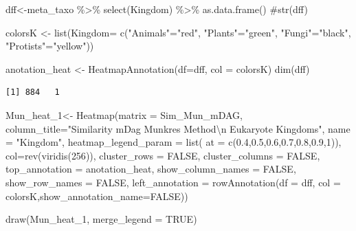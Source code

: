 \documentclass[
  letterpaper,
  DIV=11,
  numbers=noendperiod]{scrreprt}
\newenvironment{Shaded}{\begin{snugshade}}{\end{snugshade}}
\newcommand{\AttributeTok}[1]{\textcolor[rgb]{0.40,0.45,0.13}{#1}}
\newcommand{\CommentTok}[1]{\textcolor[rgb]{0.37,0.37,0.37}{#1}}
\newcommand{\ConstantTok}[1]{\textcolor[rgb]{0.56,0.35,0.01}{#1}}
\newcommand{\DecValTok}[1]{\textcolor[rgb]{0.68,0.00,0.00}{#1}}
\newcommand{\FloatTok}[1]{\textcolor[rgb]{0.68,0.00,0.00}{#1}}
\newcommand{\FunctionTok}[1]{\textcolor[rgb]{0.28,0.35,0.67}{#1}}
\newcommand{\NormalTok}[1]{\textcolor[rgb]{0.00,0.23,0.31}{#1}}
\newcommand{\OtherTok}[1]{\textcolor[rgb]{0.00,0.23,0.31}{#1}}
\newcommand{\SpecialCharTok}[1]{\textcolor[rgb]{0.37,0.37,0.37}{#1}}
\newcommand{\StringTok}[1]{\textcolor[rgb]{0.13,0.47,0.30}{#1}}
\begin{document}
\begin{Shaded}
\begin{Highlighting}[]
\NormalTok{dff}\OtherTok{\textless{}{-}}\NormalTok{meta\_taxo }\SpecialCharTok{\%\textgreater{}\%} \FunctionTok{select}\NormalTok{(Kingdom)  }\SpecialCharTok{\%\textgreater{}\%} \FunctionTok{as.data.frame}\NormalTok{()}
\CommentTok{\#str(dff)}

\NormalTok{colorsK }\OtherTok{\textless{}{-}} \FunctionTok{list}\NormalTok{(}\AttributeTok{Kingdom=} \FunctionTok{c}\NormalTok{(}\StringTok{"Animals"}\OtherTok{=}\StringTok{"red"}\NormalTok{,}
                           \StringTok{"Plants"}\OtherTok{=}\StringTok{"green"}\NormalTok{,}
                           \StringTok{"Fungi"}\OtherTok{=}\StringTok{"black"}\NormalTok{,}
                           \StringTok{"Protists"}\OtherTok{=}\StringTok{"yellow"}\NormalTok{))}

\NormalTok{anotation\_heat }\OtherTok{\textless{}{-}} \FunctionTok{HeatmapAnnotation}\NormalTok{(}\AttributeTok{df=}\NormalTok{dff, }\AttributeTok{col =}\NormalTok{ colorsK)}
\FunctionTok{dim}\NormalTok{(dff)}
\end{Highlighting}
\end{Shaded}

\begin{verbatim}
[1] 884   1
\end{verbatim}

\begin{Shaded}
\begin{Highlighting}[]
\NormalTok{Mun\_heat\_1}\OtherTok{\textless{}{-}} \FunctionTok{Heatmap}\NormalTok{(}\AttributeTok{matrix =}\NormalTok{ Sim\_Mun\_mDAG, }
                          \AttributeTok{column\_title=}\StringTok{"Similarity mDag Munkres Method}\SpecialCharTok{\textbackslash{}n}\StringTok{  Eukaryote Kingdoms"}\NormalTok{,}
            \AttributeTok{name =} \StringTok{"Kingdom"}\NormalTok{,}
            \AttributeTok{heatmap\_legend\_param =} \FunctionTok{list}\NormalTok{(}
    \AttributeTok{at =} \FunctionTok{c}\NormalTok{(}\FloatTok{0.4}\NormalTok{,}\FloatTok{0.5}\NormalTok{,}\FloatTok{0.6}\NormalTok{,}\FloatTok{0.7}\NormalTok{,}\FloatTok{0.8}\NormalTok{,}\FloatTok{0.9}\NormalTok{,}\DecValTok{1}\NormalTok{)),}
        \AttributeTok{col=}\FunctionTok{rev}\NormalTok{(}\FunctionTok{viridis}\NormalTok{(}\DecValTok{256}\NormalTok{)),}
        \AttributeTok{cluster\_rows =} \ConstantTok{FALSE}\NormalTok{,}
        \AttributeTok{cluster\_columns =} \ConstantTok{FALSE}\NormalTok{,}
        \AttributeTok{top\_annotation =}\NormalTok{ anotation\_heat,}
        \AttributeTok{show\_column\_names =} \ConstantTok{FALSE}\NormalTok{, }
        \AttributeTok{show\_row\_names =} \ConstantTok{FALSE}\NormalTok{,}
        \AttributeTok{left\_annotation =} \FunctionTok{rowAnnotation}\NormalTok{(}\AttributeTok{df =}\NormalTok{ dff, }\AttributeTok{col =}\NormalTok{ colorsK,}\AttributeTok{show\_annotation\_name=}\ConstantTok{FALSE}\NormalTok{))}
  
\FunctionTok{draw}\NormalTok{(Mun\_heat\_1, }\AttributeTok{merge\_legend =} \ConstantTok{TRUE}\NormalTok{)}
\end{Highlighting}
\end{Shaded}
\end{document}
